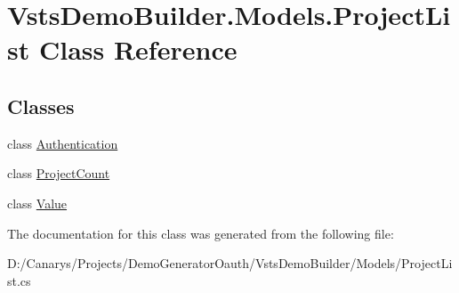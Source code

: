 \hypertarget{class_vsts_demo_builder_1_1_models_1_1_project_list}{}\section{Vsts\+Demo\+Builder.\+Models.\+Project\+List Class Reference}
\label{class_vsts_demo_builder_1_1_models_1_1_project_list}
\subsection*{Classes}
\begin{DoxyCompactItemize}
\item 
class \mbox{\hyperlink{class_vsts_demo_builder_1_1_models_1_1_project_list_1_1_authentication}{Authentication}}
\item 
class \mbox{\hyperlink{class_vsts_demo_builder_1_1_models_1_1_project_list_1_1_project_count}{Project\+Count}}
\item 
class \mbox{\hyperlink{class_vsts_demo_builder_1_1_models_1_1_project_list_1_1_value}{Value}}
\end{DoxyCompactItemize}


The documentation for this class was generated from the following file\+:\begin{DoxyCompactItemize}
\item 
D\+:/\+Canarys/\+Projects/\+Demo\+Generator\+Oauth/\+Vsts\+Demo\+Builder/\+Models/Project\+List.\+cs\end{DoxyCompactItemize}
